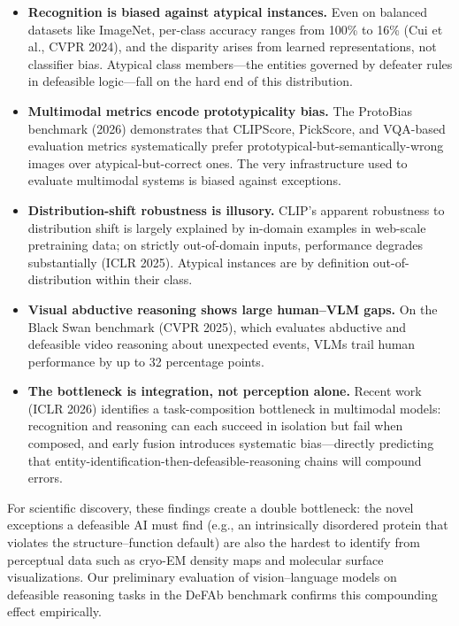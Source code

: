 \documentclass[11pt]{article}
\begin{document}
\begin{itemize}[nosep, leftmargin=1.5em]
\item \textbf{Recognition is biased against atypical instances.} Even on balanced datasets like ImageNet, per-class accuracy ranges from 100\% to 16\% (Cui et al., CVPR 2024), and the disparity arises from learned representations, not classifier bias. Atypical class members---the entities governed by defeater rules in defeasible logic---fall on the hard end of this distribution.

\item \textbf{Multimodal metrics encode prototypicality bias.} The ProtoBias benchmark (2026) demonstrates that CLIPScore, PickScore, and VQA-based evaluation metrics systematically prefer prototypical-but-semantically-wrong images over atypical-but-correct ones. The very infrastructure used to evaluate multimodal systems is biased against exceptions.

\item \textbf{Distribution-shift robustness is illusory.} CLIP's apparent robustness to distribution shift is largely explained by in-domain examples in web-scale pretraining data; on strictly out-of-domain inputs, performance degrades substantially (ICLR 2025). Atypical instances are by definition out-of-distribution within their class.

\item \textbf{Visual abductive reasoning shows large human--VLM gaps.} On the Black Swan benchmark (CVPR 2025), which evaluates abductive and defeasible video reasoning about unexpected events, VLMs trail human performance by up to 32 percentage points.

\item \textbf{The bottleneck is integration, not perception alone.} Recent work (ICLR 2026) identifies a task-composition bottleneck in multimodal models: recognition and reasoning can each succeed in isolation but fail when composed, and early fusion introduces systematic bias---directly predicting that entity-identification-then-defeasible-reasoning chains will compound errors.
\end{itemize}

\noindent For scientific discovery, these findings create a double bottleneck: the novel exceptions a defeasible AI must find (e.g., an intrinsically disordered protein that violates the structure--function default) are also the hardest to identify from perceptual data such as cryo-EM density maps and molecular surface visualizations. Our preliminary evaluation of vision--language models on defeasible reasoning tasks in the DeFAb benchmark confirms this compounding effect empirically.
\end{document}
